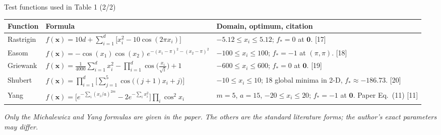 \documentclass[aspectratio=169,11pt]{beamer}
\begin{document}
\begin{frame}[t]{Test functions used in Table 1 (2/2)}
\scriptsize
\renewcommand{\arraystretch}{1.25}\setlength{\tabcolsep}{3pt}
\begin{tabular}{@{}p{}p{}p{}@{}}
\toprule
\textbf{Function} & \textbf{Formula} & \textbf{Domain, optimum, citation}\\\midrule
Rastrigin & $\displaystyle f(\mathbf{x})=10d+\sum_{i=1}^{d}\big[x_i^{2}-10\cos(2\pi x_i)\big]$ & $-5.12\le x_i\le5.12$; $f_*=0$ at $\mathbf{0}$. [17]\\
Easom & $\displaystyle f(\mathbf{x})=-\cos(x_1)\cos(x_2)\,e^{-(x_1-\pi)^{2}-(x_2-\pi)^{2}}$ & $-100\le x_i\le100$; $f_*=-1$ at $(\pi,\pi)$. [18]\\
Griewank & $\displaystyle f(\mathbf{x})=\frac{1}{4000}\sum_{i=1}^{d}x_i^{2}-\prod_{i=1}^{d}\cos\!\Big(\tfrac{x_i}{\sqrt i}\Big)+1$ & $-600\le x_i\le600$; $f_*=0$ at $\mathbf{0}$. [19]\\
Shubert & $\displaystyle f(\mathbf{x})=\prod_{i=1}^{d}\Big[\sum_{j=1}^{5}\cos\big((j+1)x_i+j\big)\Big]$ & $-10\le x_i\le10$; 18 global minima in 2-D, $f_*\approx-186.73$. [20]\\
Yang & $\displaystyle f(\mathbf{x})=\Big[e^{-\sum_i(x_i/a)^{2m}}-2e^{-\sum_i x_i^{2}}\Big]\prod_i\cos^{2}x_i$ & $m=5$, $a=15$, $-20\le x_i\le20$; $f_*=-1$ at $\mathbf{0}$. Paper Eq.~(11) [11]\\
\bottomrule
\end{tabular}
\par\vspace{0.2em}
{\scriptsize\itshape Only the Michalewicz and Yang formulas are given in the paper. The others are the standard literature forms; the author's exact parameters may differ.\par}
\end{frame}
\end{document}
